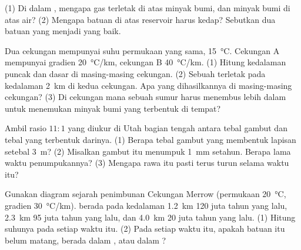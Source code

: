 \begin{exercise}[$\star$]\label{exo:g11:fossil-fuel-geology:5}
(1) Di dalam , mengapa gas terletak di atas minyak bumi, dan minyak
bumi di atas air? (2) Mengapa batuan di atas reservoir harus kedap? Sebutkan
dua batuan yang menjadi  yang baik.
\end{exercise}

\begin{exercise}[$\star\star$]\label{exo:g11:fossil-fuel-geology:6}
Dua cekungan mempunyai suhu permukaan yang sama, \qty{15}{\degreeCelsius}.
Cekungan A mempunyai gradien \qty{20}{\degreeCelsius/km}, cekungan B
\qty{40}{\degreeCelsius/km}. (1) Hitung kedalaman puncak dan dasar  di masing-masing cekungan. (2) Sebuah  terletak pada
kedalaman \qty{2}{km} di kedua cekungan. Apa yang dihasilkannya di
masing-masing cekungan? (3) Di cekungan mana sebuah sumur harus menembus lebih
dalam untuk menemukan minyak bumi yang terbentuk di tempat?
\end{exercise}

\begin{exercise}[$\star\star$]\label{exo:g11:fossil-fuel-geology:7}
Ambil rasio $11{:}1$ yang diukur di Utah bagian tengah antara tebal gambut dan
tebal  yang terbentuk darinya. (1) Berapa tebal gambut yang membentuk
lapisan  setebal \qty{3}{m}? (2) Misalkan gambut itu menumpuk
\qty{1}{mm} setahun. Berapa lama waktu penumpukannya? (3) Mengapa rawa itu
pasti terus turun selama waktu itu?
\end{exercise}

\begin{exercise}[$\star\star$]\label{exo:g11:fossil-fuel-geology:8}
Gunakan diagram sejarah penimbunan Cekungan Merrow (permukaan
\qty{20}{\degreeCelsius}, gradien \qty{30}{\degreeCelsius/km}). 
berada pada kedalaman \qty{1.2}{km} 120 juta tahun yang lalu, \qty{2.3}{km} 95
juta tahun yang lalu, dan \qty{4.0}{km} 20 juta tahun yang lalu. (1) Hitung
suhunya pada setiap waktu itu. (2) Pada setiap waktu itu, apakah batuan itu
belum matang, berada dalam , atau dalam ?
\end{exercise}

